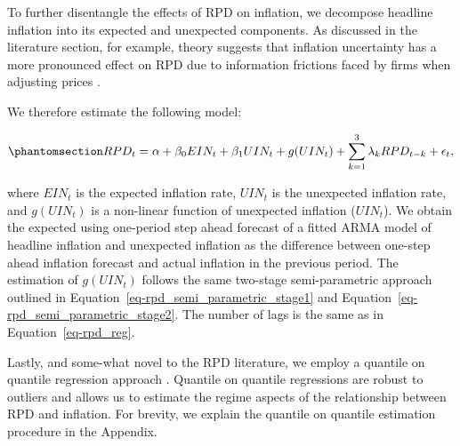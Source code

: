 \documentclass[
  letterpaper,
  DIV=11,
  numbers=noendperiod]{scrartcl}
\begin{document}
To further disentangle the effects of RPD on inflation, we decompose
headline inflation into its expected and unexpected components. As
discussed in the literature section, for example, theory suggests that
inflation uncertainty has a more pronounced effect on RPD due to
information frictions faced by firms when adjusting prices
\citep{lucas1973, hercowitz1981, cukierman1983}.

\newpage

We therefore estimate the following model:

\begin{equation}\phantomsection\label{eq-unexpected}{ RPD_t = \alpha + \beta_0 EIN_t + \beta_1 UIN_t + g(UIN_t) + \sum_{k=1}^{3}\lambda_k RPD_{t-k} + \epsilon_t, }\end{equation}

where \(EIN_t\) is the expected inflation rate, \(UIN_t\) is the
unexpected inflation rate, and \(g(UIN_t)\) is a non-linear function of
unexpected inflation (\(UIN_t\)). We obtain the expected using
one-period step ahead forecast of a fitted ARMA model of headline
inflation and unexpected inflation as the difference between one-step
ahead inflation forecast and actual inflation in the previous period.
The estimation of \(g(UIN_t)\) follows the same two-stage
semi-parametric approach outlined in
Equation~\ref{eq-rpd_semi_parametric_stage1} and
Equation~\ref{eq-rpd_semi_parametric_stage2}. The number of lags is the
same as in Equation~\ref{eq-rpd_reg}.

Lastly, and some-what novel to the RPD literature, we employ a quantile
on quantile regression approach \citep{koenker2017}. Quantile on
quantile regressions are robust to outliers and allows us to estimate
the regime aspects of the relationship between RPD and inflation. For
brevity, we explain the quantile on quantile estimation procedure in the
Appendix.
\end{document}
